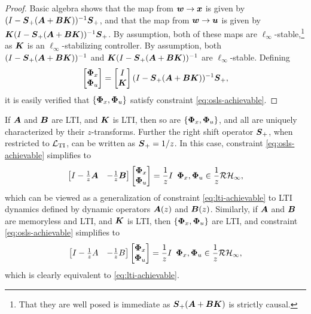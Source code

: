 \begin{proof}
Basic algebra shows that the map from $\boldsymbol{w} \to \boldsymbol{x}$ is given by $(I-\boldsymbol{S}_+(\boldsymbol{A}+\boldsymbol{B}\boldsymbol{K}))^{-1}\boldsymbol{S}_+$, and that the map from $\boldsymbol{w} \to \boldsymbol{u}$ is given by $\boldsymbol{K}(I-\boldsymbol{S}_+(\boldsymbol{A}+\boldsymbol{B}\boldsymbol{K}))^{-1}\boldsymbol{S}_+$.  By assumption, both of these maps are $\ell_\infty$-stable,\footnote{That they are well posed is immediate as $\boldsymbol{S}_+(\boldsymbol{A}+\boldsymbol{B}\boldsymbol{K})$ is strictly causal.} as $\boldsymbol{K}$ is an $\ell_\infty$-stabilizing controller.
By assumption, both $(I-\boldsymbol{S}_+(\boldsymbol{A}+\boldsymbol{B}\boldsymbol{K}))^{-1}$ and $\boldsymbol{K}(I-\boldsymbol{S}_+(\boldsymbol{A}+\boldsymbol{B}\boldsymbol{K}))^{-1}$ are $\ell_\infty$-stable.  Defining
\[
\begin{bmatrix}
\boldsymbol{\Phi}_x \\ \boldsymbol{\Phi}_u
\end{bmatrix} =
\begin{bmatrix} I \\ \boldsymbol{K} \end{bmatrix}(I-\boldsymbol{S}_+(\boldsymbol{A}+\boldsymbol{B}\boldsymbol{K}))^{-1}\boldsymbol{S}_+,
\]
it is easily verified that $\left\{\boldsymbol{\Phi}_x,\boldsymbol{\Phi}_u\right\}$ satisfy constraint \eqref{eq:osls-achievable}.
\end{proof}
\begin{remark}
If $\boldsymbol{A}$ and $\boldsymbol{B}$ are LTI, and $\boldsymbol{K}$ is LTI, then so are $\{\boldsymbol{\Phi}_x,\boldsymbol{\Phi}_u\}$, and all are uniquely characterized by their $z$-transforms.  Further the right shift operator $\boldsymbol{S}_+$, when restricted to $\mathcal{L}_{\mathrm{TI}}$, can be written as $\boldsymbol{S}_+=1/z$.  In this case, constraint \eqref{eq:osls-achievable} simplifies to
\begin{equation}
\begin{bmatrix} I - \frac{1}{z}\boldsymbol{A}& -\frac{1}{z}\boldsymbol{B} \end{bmatrix} \begin{bmatrix} \boldsymbol{\Phi}_x \\ \boldsymbol{\Phi}_u\end{bmatrix} = \frac{1}{z}I \, \ \boldsymbol{\Phi}_x, \boldsymbol{\Phi}_u \in \frac{1}{z}\mathcal{RH}_\infty,
\end{equation}
which can be viewed as a generalization of constraint \eqref{eq:lti-achievable} to LTI dynamics defined by dynamic operators $\boldsymbol{A}(z)$ and $\boldsymbol{B}(z)$.  Similarly, if $\boldsymbol{A}$ and $\boldsymbol{B}$ are memoryless and LTI, and $\boldsymbol{K}$ is LTI, then $\{\boldsymbol{\Phi}_x,\boldsymbol{\Phi}_u\}$ are LTI, and constraint \eqref{eq:osls-achievable} simplifies to
\begin{equation}
\begin{bmatrix} I - \frac{1}{z}A & -\frac{1}{z}B \end{bmatrix} \begin{bmatrix} \boldsymbol{\Phi}_x \\ \boldsymbol{\Phi}_u \end{bmatrix} = \frac{1}{z}I \, \ \boldsymbol{\Phi}_x, \boldsymbol{\Phi}_u \in \frac{1}{z}\mathcal{RH}_\infty,
\end{equation}
which is clearly equivalent to \eqref{eq:lti-achievable}.
\end{remark}

